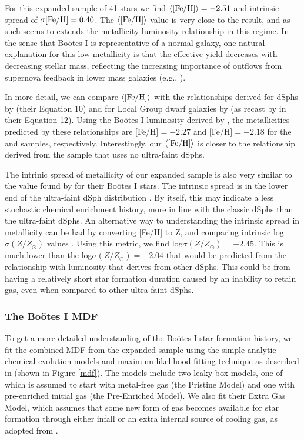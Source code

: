\documentclass[iop]{emulateapj}
\def\bootes{Bo\"{o}tes I}
\begin{document}
For this expanded sample of 41 stars we find $\langle {\rm [Fe/H]}
\rangle = -2.51$ and intrinsic spread of $\sigma{\rm
  [Fe/H]}=0.40$. The $\langle {\rm [Fe/H]} \rangle$ value is very
close to the \citet{norris10b} result, and as such seems to extends
the metallicity-luminosity relationship in this regime. In the sense
that \bootes{} is representative of a normal galaxy, one natural
explanation for this low metallicity is that the effective yield
decreases with decreasing stellar mass, reflecting the increasing
importance of outflows from supernova feedback in lower mass galaxies
(e.g., \citealt{tremonti04,prantzos08}).

In more detail, we can compare $\langle {\rm [Fe/H]} \rangle$ with the
relationships derived for dSphs by \citet{kirby11a} (their Equation
10) and for Local Group dwarf galaxies by \citet{woo08} (as recast by
\citealt{kirby11a} in their Equation 12). Using the \bootes{}
luminosity derived by \citet{martin08}, the metallicities predicted by
these relationships are [Fe/H]$=-2.27$ and [Fe/H]$=-2.18$ for the
\citet{woo08} and \citet{kirby11a} samples,
respectively. Interestingly, our $\langle {\rm [Fe/H]} \rangle$ is
closer to the relationship derived from the \citet{woo08} sample that
uses no ultra-faint dSphs.

The intrinic spread of metallicity of our expanded sample is also very
similar to the value found by \citet{norris10b} for their \bootes{}
stars. The intrinsic spread is in the lower end of the ultra-faint
dSph distribution \citep{norris10b,kirby11a}. By itself, this may
indicate a less stochastic chemical enrichment history, more in line
with the classic dSphs than the ultra-faint dSphs. An alternative way
to understanding the intrinsic spread in metallicity can be had by
converting [Fe/H] to Z, and comparing intrinsic
log$\sigma(Z/Z_{\odot})$ values \citep{kirby11a}. Using this metric,
we find log$\sigma(Z/Z_{\odot})=-2.45$. This is much lower than the
log$\sigma(Z/Z_{\odot})=-2.04$ that would be predicted from the
relationship with luminosity that \citet{kirby11a} derives from other
dSphs. This could be from having a relatively short star formation
duration caused by an inability to retain gas, even when compared to
other ultra-faint dSphs.

\subsubsection{The \bootes{} MDF}

To get a more detailed understanding of the \bootes{} star formation
history, we fit the combined MDF from the expanded sample using the simple analytic chemical
evolution models and maximum likelihood fitting technique as described in
\citet{kirby09,kirby11a} (shown in Figure \ref{mdf}). The models
include two leaky-box models, one of which is assumed to start with
metal-free gas (the Pristine Model) and one with pre-enriched initial
gas (the Pre-Enriched Model). We also fit their Extra Gas Model, which
assumes that some new form of gas becomes available for star formation
through either infall or an extra internal source of cooling gas, as
adopted from \citet{lb75}.
\end{document}
